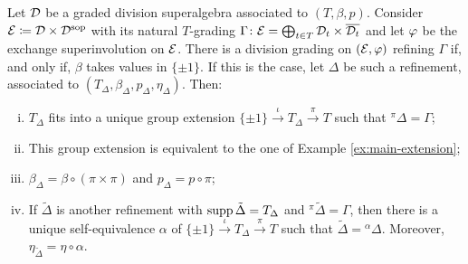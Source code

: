 \begin{thm}\label{thm:refinement-DxDsop}
    Let $\mathcal{D}$ be a graded division superalgebra associated to $(T, \beta, p)$.  
    Consider $\mathcal E \coloneqq \mathcal{D} \times \mathcal{D}^{\mathrm{sop}}$ with its natural $T$-grading $\Gamma\colon \mathcal E = \bigoplus_{t\in T} \mathcal{D}_t \times \overline{\mathcal{D}_t}$ and let $\varphi$ be the exchange superinvolution on $\mathcal E$. 
    There is a division grading on $(\mathcal E, \varphi)$ refining $\Gamma$ if, and only if, $\beta$ takes values in $\{ \pm 1 \}$. 
    If this is the case, let $\Delta$ be such a refinement, associated to $(T_\Delta, \beta_\Delta, p_\Delta, \eta_\Delta)$. 
    Then: %
    \begin{enumerate}[(i)]
        
        \item %
        $T_\Delta$ fits into a unique group extension $\{ \pm 1 \} \xrightarrow{\iota} T_\Delta \xrightarrow{\pi} T$ such that ${}^{\pi} \Delta = \Gamma$; \label{item:there-is-extension}
        
        \item This group extension is equivalent to the one of Example \ref{ex:main-extension}; \label{item:equivalent-extension-example}
        \item $\beta_\Delta = \beta \circ (\pi \times \pi)$ and $p_\Delta = p \circ \pi$; \label{item:beta-and-p-delta}
        \item If $\tilde \Delta$ is another refinement with $\operatorname{supp} \tilde \Delta = T_\Delta$ and ${}^\pi \tilde \Delta = \Gamma$, then there is a unique self-equivalence $\alpha$ of $\{ \pm 1 \} \xrightarrow{\iota} T_\Delta \xrightarrow{\pi} T$ such that $\tilde \Delta = {}^\alpha \Delta$. 
        Moreover, $\eta_{\tilde \Delta} = \eta \circ \alpha$. \label{item:number-of-extensions}
    \end{enumerate}

\end{thm}


